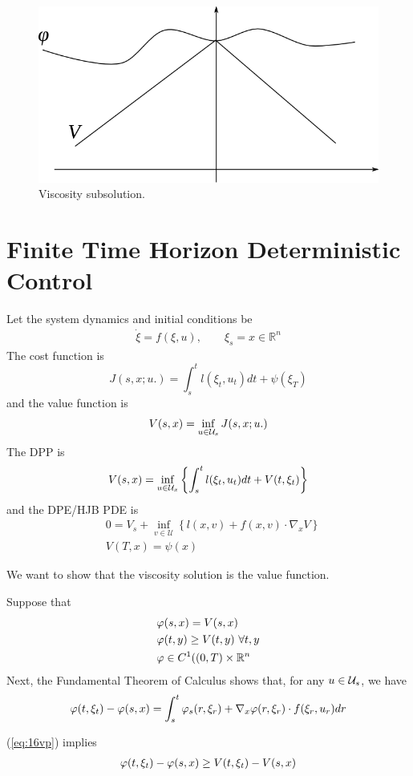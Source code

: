 \begin{figure}[ht!]
	\centering
	\includegraphics[width=.4\textwidth]{images/16subsol}
	\caption{Viscosity subsolution.}
	\label{fig:16subsol}
\end{figure}

\section{Finite Time Horizon Deterministic Control}
Let the system dynamics and initial conditions be
\begin{align*}
\dot{\xi} = f(\xi,u), \qquad \xi_s=x\in\mathbb{R}^n
\end{align*}
The cost function is
$$J(s,x;u.) = \int_s^tl(\xi_t,u_t)dt+\psi(\xi_T)$$
and the value function is
$$V(s,x) = \inf_{u\in\mathcal{U}_s}J(s,x;u.)$$
The DPP is
$$V(s,x) = \inf_{u\in\mathcal{U}_x}\left\lbrace \int_s^tl(\xi_t,u_t)dt+V(t,\xi_t) \right\rbrace$$
and the DPE/HJB PDE is
\begin{align}
\label{eq:16dpe}
&0 = V_s + \inf_{v\in\mathcal{U}}\left\lbrace l(x,v)+f(x,v)\cdot\nabla_xV\right\rbrace \\
&V(T,x) = \psi(x) \nonumber
\end{align}

We want to show that the viscosity solution is the value function.

Suppose that
\begin{align}
\label{eq:16vp}
\begin{split}
&\varphi(s,x)=V(s,x) \\
&\varphi(t,y)\geq V(t,y) ~\forall t,y \\
&\varphi\in C^1((0,T)\times\mathbb{R}^n
\end{split}
\end{align}
Next, the Fundamental Theorem of Calculus shows that, for any $u\in\mathcal{U}_s$, we have
\begin{align}
\label{eq:16fund}
\varphi(t,\xi_t)-\varphi(s,x) = \int_s^t\varphi_s(r,\xi_r)+\nabla_x\varphi(r,\xi_r)\cdot f(\xi_r,u_r)dr
\end{align}

(\ref{eq:16vp}) implies
\begin{align}
\label{eq:16vpv}
\varphi(t,\xi_t)-\varphi(s,x)\geq V(t,\xi_t)-V(s,x)
\end{align}

